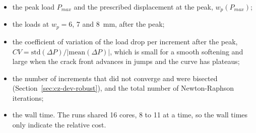 \begin{itemize}
	\item the peak load $P_{max}$ and the prescribed displacement at the peak, $w_p(P_{max})$;
	\item the loads at $w_p = 6$, 7 and 8~mm, after the peak;
	\item the coefficient of variation of the load drop per increment after the peak, $CV = \mathrm{std}(\Delta P)/|\mathrm{mean}(\Delta P)|$, which is small for a smooth softening and large when the crack front advances in jumps and the curve has plateaus;
	\item the number of increments that did not converge and were bisected (Section~\ref{sec:cz-dev-robust}), and the total number of Newton-Raphson iterations;
	\item the wall time. The runs shared 16 cores, 8 to 11 at a time, so the wall times only indicate the relative cost.
\end{itemize}

